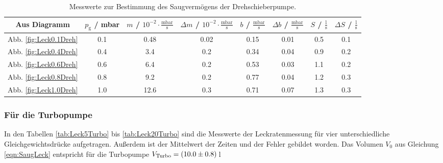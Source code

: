 \begin{table}[H]
   \caption{Messwerte zur Bestimmung des Saugvermögens der Drehschieberpumpe.}
   \label{tab:SaugLeckDreh}
   \hspace{-2cm}
   \begin{tabular}{c|c|c|c|c|c|c|c}
     Aus Diagramm & $p_\text{g}$ / mbar & $m$ / $10^{-2}\cdot\frac{\text{mbar}}{\text{s}}$ & $\Delta m$ / $10^{-2}\cdot\frac{\text{mbar}}{\text{s}}$ & $b$ / $\frac{\text{mbar}}{\text{s}}$ & $\Delta b$ / $\frac{\text{mbar}}{\text{s}}$ & $S$ / $\frac{\text{l}}{\text{s}}$ & $\Delta S$ / $\frac{\text{l}}{\text{s}}$ \\
     \midrule
     Abb. \eqref{fig:Leck0.1Dreh} & 0.1 & 0.48 & 0.02 & 0.15 & 0.01 & 0.5 & 0.1 \\
     Abb. \eqref{fig:Leck0.4Dreh} & 0.4 & 3.4 & 0.2 & 0.34 & 0.04 & 0.9 & 0.2 \\
     Abb. \eqref{fig:Leck0.6Dreh} & 0.6 & 6.4 & 0.2 & 0.53 & 0.03 & 1.1 & 0.2 \\
     Abb. \eqref{fig:Leck0.8Dreh} & 0.8 & 9.2 & 0.2 & 0.77 & 0.04 & 1.2 & 0.3 \\
     Abb. \eqref{fig:Leck1.0Dreh} & 1.0 & 12.6 & 0.3 & 0.71 & 0.07 & 1.3 & 0.3 \\
 \end{tabular}
\end{table}



\subsubsection{Für die Turbopumpe}
In den Tabellen \eqref{tab:Leck5Turbo} bis \eqref{tab:Leck20Turbo} sind die Messwerte der Leckratenmessung für vier unterschiedliche Gleichgewichtsdrücke aufgetragen. Außerdem ist der Mittelwert der Zeiten und der Fehler gebildet worden. Das Volumen $V_0$ aus Gleichung \eqref{eqn:SaugLeck} entspricht für die Turbopumpe $V_\text{Turbo} = (\num{10.0 +- 0.8})$\,l

